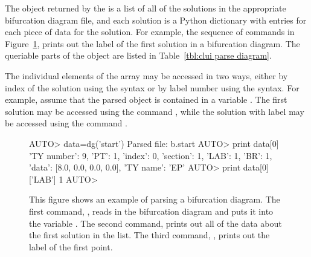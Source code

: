 \documentclass[12pt]{report}
\begin{document}
 The object returned by the  
 is a list of all of the solutions in the appropriate
 bifurcation diagram file, and each solution is a Python
 dictionary with entries for each piece of
 data for the solution.  For example, the sequence of commands
 in Figure~\ref{exa:clui parse diagram}, prints out the
 label of the first solution in a bifurcation diagram.
 The queriable parts of the object are listed in
 Table~\ref{tbl:clui parse diagram}.

 The individual elements of the array may be accessed 
 in two ways, either by index of the solution using the
 \commandf{[]} syntax or by label number using the
 \commandf{()} syntax.  For example, assume that the parsed object is contained
 in a variable .  
 The first solution may be accessed 
 using the command , while the solution with
 label  may be accessed using the command .

 \begin{figure}[htbp]
 {\small \begin{center} \begin{boxedverbatim}
 AUTO> data=dg('start')
 Parsed file: b.start
 AUTO> print data[0]
 {'TY number': 9, 'PT': 1, 'index': 0, 'section': 1, 'LAB': 1, 'BR': 1, 'data': [8.0, 0.0, 0.0, 0.0], 'TY name': 'EP'}
 AUTO> print data[0]['LAB']
 1
 AUTO> 
 \end{boxedverbatim}
 \end{center} 
 }
 \caption[An example of parsing a bifurcation diagram.]
 {This figure shows an example of parsing a bifurcation diagram.
 The first command, , reads in the bifurcation
 diagram and puts it into the variable .
 The second command,  prints out all of
 the data about the first solution in the list.
 The third command, , prints
 out the label of the first point.
 }
 \label{exa:clui parse diagram}
 \end{figure}
\end{document}
